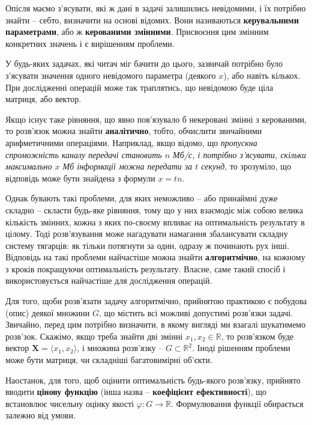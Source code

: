 \documentclass[../book.tex]{subfiles}
\begin{document}
Опісля маємо з'ясувати, які ж дані в задачі залишились невідомими, і їх потрібно знайти -- себто, визначити на основі відомих. Вони називаються \textbf{керувальними параметрами}, або ж \textbf{керованими змінними}. Присвоєння цим змінним конкретних значень і є вирішенням проблеми.

У будь-яких задачах, які читач міг бачити до цього, зазвичай по\-тріб\-но було з'ясувати значення одного невідомого параметра (деякого $x$), або навіть кількох. При дослідженні операцій може так траплятись, що невідомою буде ціла матриця, або вектор.

Якщо існує таке рівняння, що явно пов'язувало б некеровані змінні з керованими, то розв'язок можна знайти \textbf{аналітично}, тобто, обчислити звичайними арифметичними операціями. Наприклад, якщо відомо, що \textit{пропускна спроможність каналу передачі становить $n$ Мб/с, і потрібно з'ясувати, скільки максимально $x$ Мб інформації можна передати за $t$ секунд}, то зрозуміло, що відповідь може бути знайдена з формули ${x=tn}$.

Однак бувають такі проблеми, для яких неможливо -- або принаймні дуже складно -- скласти будь-яке рівняння, тому що у них взаємодіє між собою велика кількість змінних, кожна з яких по-своєму впливає на оптимальність результату в цілому. Тоді розв'язування може нагадувати намагання збалансувати складну систему тягарців: як тільки потягнути за один, одразу ж починають рух інші. Відповідь на такі проблеми найчастіше можна знайти \textbf{алгоритмічно}, на кожному з кроків покращуючи оптимальність результату. Власне, саме такий спосіб і використовується найчастіше для дослідження операцій.

Для того, щоби розв'язати задачу алгоритмічно, прийнятою практикою є побудова (опис) деякої множини $G$, що містить всі можливі допустимі розв'язки задачі. Звичайно, перед цим потрібно визначити, в якому вигляді ми взагалі шукатимемо розв'зок. Скажімо, якщо треба знайти дві змінні $x_1, x_2 \in \mathbb{R}$, то розв'язком буде вектор $\mathbf{X} = {\langle x_1, x_2 \rangle}$, і множина розв'язку -- $G \subset \mathbb{R}^2$. Іноді рішенням проблеми може бути матриця, чи складніші багатовимірні об'єкти.

Наостанок, для того, щоб оцінити оптимальність будь-якого роз\-в'яз\-ку, прийнято вводити \textbf{цінову функцію} (інша назва -- \textbf{коефіцієнт ефективності}), що встановлює чисельну оцінку якості ${\varphi: G \rightarrow \mathbb{R}}$. Формулювання функції обирається залежно від умови.
\end{document}
